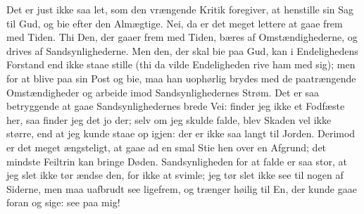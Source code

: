 \documentclass[12pt,a4paper]{book}
\begin{document}
Det er just ikke saa let, som den vrængende Kritik foregiver, at
henstille sin Sag til Gud, og bie efter den Almægtige. Nei, da er det
meget lettere at gaae frem med Tiden. Thi Den, der gaaer frem med Tiden,
bæres af Omstændighederne, og drives af Sandsynlighederne. Men den, der
skal bie paa Gud, kan i Endelighedens Forstand end ikke staae stille (thi
da vilde Endeligheden rive ham med sig); men for at blive paa sin Post og
bie, maa han uophørlig brydes med de paatrængende Omstændigheder og
arbeide imod Sandsynlighedernes Strøm. Det er saa betryggende at gaae
Sandsynlighedernes brede Vei: finder jeg ikke et Fodfæste her, saa finder
jeg det jo der; selv om jeg skulde falde, blev Skaden vel ikke større,
end at jeg kunde staae op igjen: der er ikke saa langt til Jorden.
Derimod er det meget ængsteligt, at gaae ad en smal Stie hen over en
Afgrund; det mindste Feiltrin kan bringe Døden. Sandsynligheden for at
falde er saa stor, at jeg slet ikke tør ændse den, for ikke at svimle;
jeg tør slet ikke see til nogen af Siderne, men maa uafbrudt see
ligefrem, og trænger høilig til En, der kunde gaae foran og sige: see paa
mig!
\end{document}
